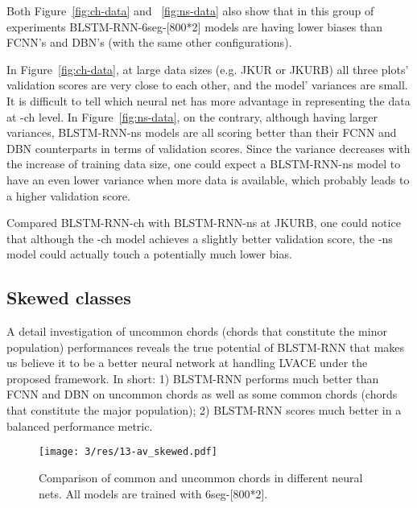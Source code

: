 Both Figure~\ref{fig:ch-data} and ~\ref{fig:ns-data} also show that in this group of experiments BLSTM-RNN-6seg-[800*2] models are having lower biases than FCNN's and DBN's (with the same other configurations).

In Figure~\ref{fig:ch-data}, at large data sizes (e.g. JKUR or JKURB) all three plots' validation scores are very close to each other, and the model' variances are small. It is difficult to tell which neural net has more advantage in representing the data at -ch level. In Figure~\ref{fig:ns-data}, on the contrary, although having larger variances, BLSTM-RNN-ns models are all scoring better than their FCNN and DBN counterparts in terms of validation scores. Since the variance decreases with the increase of training data size, one could expect a BLSTM-RNN-ns model to have an even lower variance when more data is available, which probably leads to a higher validation score.

Compared BLSTM-RNN-ch with BLSTM-RNN-ns at JKURB, one could notice that although the -ch model achieves a slightly better validation score, the -ns model could actually touch a potentially much lower bias. %

\subsection{Skewed classes}\label{sec:3-p7}

A detail investigation of uncommon chords (chords that constitute the minor population) performances reveals the true potential of BLSTM-RNN that makes us believe it to be a better neural network at handling LVACE under the proposed framework. In short: 1) BLSTM-RNN performs much better than FCNN and DBN on uncommon chords as well as some common chords (chords that constitute the major population); 2) BLSTM-RNN scores much better in a balanced performance metric.
\begin{figure}[htb]
	\centering
    \texttt{[image: 3/res/13-av\_skewed.pdf]}
	\caption{Comparison of common and uncommon chords in different neural nets. All models are trained with 6seg-[800*2].}
	\label{fig:blstm-long-tail}
\end{figure}

